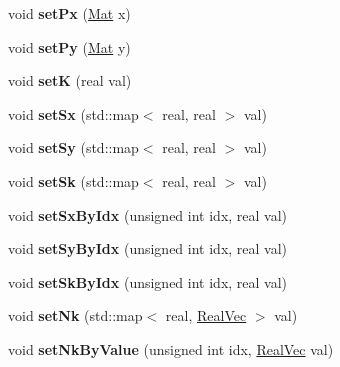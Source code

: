 \begin{DoxyCompactItemize}
void {\bfseries set\+Px} (\mbox{\hyperlink{aux_8h_aa1fe91b8cd36c618282eb0d548690c4c}{Mat}} x)
\item 
\mbox{\label{classvd_a8314de29eacf72f10afee2c67b0c9819}} 
void {\bfseries set\+Py} (\mbox{\hyperlink{aux_8h_aa1fe91b8cd36c618282eb0d548690c4c}{Mat}} y)
\item 
\mbox{\label{classvd_a7c692a97b49c4596c4ec1bc0a129b516}} 
void {\bfseries setK} (real val)
\item 
\mbox{\label{classvd_afb492f7d32ff2a4d54bd531d57d66a1a}} 
void {\bfseries set\+Sx} (std\+::map$<$ real, real $>$ val)
\item 
\mbox{\label{classvd_af103a45c726643e96f69be4363ad2409}} 
void {\bfseries set\+Sy} (std\+::map$<$ real, real $>$ val)
\item 
\mbox{\label{classvd_a42dc1ab4c7033c49c0b3716d461ad2ef}} 
void {\bfseries set\+Sk} (std\+::map$<$ real, real $>$ val)
\item 
\mbox{\label{classvd_a28b1a96051112e13734bd09fdfa0e165}} 
void {\bfseries set\+Sx\+By\+Idx} (unsigned int idx, real val)
\item 
\mbox{\label{classvd_abb229381c39157015dad7cdfd095b434}} 
void {\bfseries set\+Sy\+By\+Idx} (unsigned int idx, real val)
\item 
\mbox{\label{classvd_a777ef30414be47a33432358750802d0a}} 
void {\bfseries set\+Sk\+By\+Idx} (unsigned int idx, real val)
\item 
\mbox{\label{classvd_aa1a3d9448f6ff6f8076b15c9e9a63d7e}} 
void {\bfseries set\+Nk} (std\+::map$<$ real, \mbox{\hyperlink{aux_8h_ac0a1a538b45426e056715d1f59f854ab}{Real\+Vec}} $>$ val)
\item 
\mbox{\label{classvd_a769ad1fef725d8e644c4634fe7d5a559}} 
void {\bfseries set\+Nk\+By\+Value} (unsigned int idx, \mbox{\hyperlink{aux_8h_ac0a1a538b45426e056715d1f59f854ab}{Real\+Vec}} val)
\item 
\mbox{\label{classvd_a59c1f5756af7de9cc7a0089221cbd5b7}} 

\end{DoxyCompactItemize}
